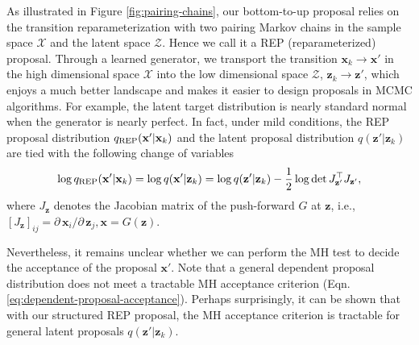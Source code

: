 \documentclass{article} %
\newcommand{\bx}{\mathbf{x}}
\newcommand{\bz}{\mathbf{z}}
\newcommand{\cX}{\mathcal{X}}
\newcommand{\cZ}{\mathcal{Z}}
\newcommand{\bbR}{\mathbb{R}}
\newcommand{\<}{\left\langle}
\renewcommand{\>}{\right\rangle}
\begin{document}
As illustrated in Figure \ref{fig:pairing-chains}, our bottom-to-up proposal relies on the transition reparameterization with two pairing Markov chains in the sample space $\cX$ and the latent space $\cZ$. Hence we call it a REP (reparameterized) proposal. Through a learned generator, we transport the transition $\bx_k\to\bx'$ in the high dimensional space $\cX$ into the low dimensional space $\cZ$, $\bz_k\to\bz'$, which enjoys a much better landscape and makes it easier to design proposals in MCMC algorithms. For example, the latent target distribution is nearly standard normal when the generator is nearly perfect.
In fact, under mild conditions, the REP proposal distribution $q_{\rm REP}(\bx'|\bx_k)$ and the latent proposal distribution $q(\bz'|\bz_k)$ are tied with the following change of variables \citep{gemici2016normalizing,ben1999change}
\begin{equation}
    \log q_{\rm REP}(\bx'|\bx_k)= \log q(\bx'|\bz_k)
    =\log q(\bz'|\bz_k) - \frac{1}{2}\log\det J_{\bz'}^\top J_{\bz'},
    \label{eq:cmc-proposal-change-of-variable}
\end{equation}
where $J_\bz$ denotes the Jacobian matrix of the push-forward $G$ at $\bz$, i.e., $\left[J_\bz\right]_{ij} = \partial\,\bx_i/\partial\,\bz_j, \bx=G(\bz)$.


Nevertheless, it remains unclear whether we can perform the MH test to decide the acceptance of the proposal $\bx'$. Note that a general dependent proposal distribution does not meet a tractable MH acceptance criterion (Eqn. \eqref{eq:dependent-proposal-acceptance}). Perhaps surprisingly, 
it can be shown that with our structured REP proposal, 
the MH acceptance criterion is tractable for general latent proposals $q(\bz'|\bz_k)$. 
\end{document}
